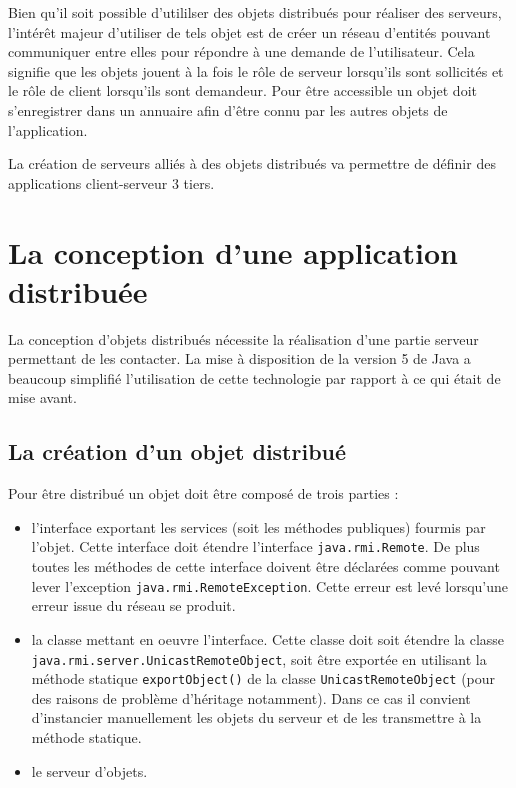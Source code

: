 \documentclass[a4paper,11pt]{report}
\begin{document}
Bien qu\rq{}il soit possible d\rq{}utililser des objets distribués pour réaliser des serveurs, l\rq{}intérêt majeur d\rq{}utiliser de tels objet est de créer un réseau d\rq{}entités pouvant communiquer entre elles pour répondre à une demande de l\rq{}utilisateur. Cela signifie que les objets jouent à la fois le rôle de serveur lorsqu\rq{}ils sont sollicités et le rôle de client lorsqu\rq{}ils sont demandeur. Pour être accessible un objet doit s\rq{}enregistrer dans un annuaire afin d\rq{}être connu par les autres objets de l\rq{}application.

La création de serveurs alliés à des objets distribués va permettre de définir des applications client-serveur 3 tiers.


\section{La conception d\rq{}une application distribuée}

La conception d\rq{}objets distribués nécessite la réalisation d\rq{}une partie serveur permettant de les contacter. La mise à disposition de la version 5 de Java a beaucoup simplifié l\rq{}utilisation de cette technologie par rapport à ce qui était de mise avant.

\subsection{La création d\rq{}un objet distribué}
Pour être distribué un objet doit être composé de trois parties :
\begin{itemize}
\item l\rq{}interface exportant les services (soit les méthodes publiques)  fourmis par l\rq{}objet. Cette interface doit étendre l\rq{}interface \texttt{java.\-rmi.\-Remote}. De plus toutes les méthodes de cette interface doivent être déclarées comme pouvant lever l\rq{}exception \texttt{java.\-rmi.\-RemoteException}. Cette erreur est levé lorsqu\rq{}une erreur issue du réseau se produit.
\item la classe mettant en oeuvre l\rq{}interface. Cette classe doit soit étendre la classe \texttt{java.\-rmi.\-server.\-UnicastRemoteObject}, soit être exportée en utilisant la méthode statique \texttt{exportObject()} de la classe \texttt{UnicastRemoteObject} (pour des raisons de problème d\rq{}héritage notamment). Dans ce cas il convient d\rq{}instancier manuellement les objets du serveur et de les transmettre à la méthode statique.
\item le serveur d\rq{}objets.
\end{itemize}
\end{document}
